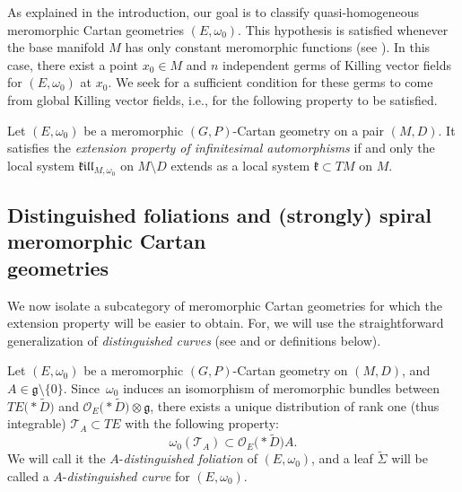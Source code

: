 \documentclass[10pt,a4paper]{amsart}
\numberwithin{equation}{section}
\begin{document}
As explained in the introduction, our goal is to classify quasi-homogeneous meromorphic Cartan geometries $(E,\omega_0)$. This hypothesis is satisfied whenever the base manifold $M$ has only constant meromorphic functions (see \cite[Theorem 1.2]{Dumitrescu1}). In this case, there exist a point $x_0 \in M$ and $n$ independent germs of Killing vector fields for $(E,\omega_0)$ at $x_0$. We seek for a sufficient condition for these germs to come from global Killing vector fields, i.e., for the following property to be satisfied.

\begin{Definition}\label{extensionproperty} Let $(E,\omega_0)$ be a meromorphic $(G,P)$-Cartan geometry on a pair $(M,D)$. It satisfies the \textit{extension property of infinitesimal automorphisms} if and only the local system $\mathfrak{k}\mathfrak{i}\mathfrak{l}\mathfrak{l}_{M,\omega_0}$ on $M\setminus D$ extends as a local system $\mathfrak{k}\subset TM$ on $M$. \end{Definition}

\subsection[Distinguished foliations and (strongly) spiral meromorphic Cartan geometries]{Distinguished foliations and (strongly) spiral meromorphic Cartan \\ geometries}\label{sectionspiral}

We now isolate a subcategory of meromorphic Cartan geometries for which the extension property will be easier to obtain. For, we will use the straightforward generalization of \textit{distinguished curves} (see \cite[p.~112]{Cap} and \cite[Definition~4.16]{Sharpe} or definitions below).

Let $(E,\omega_0)$ be a meromorphic $(G,P)$-Cartan geometry on $(M,D)$, and $A\in \mathfrak{g}\setminus \{0\}$. Since~$\omega_0$ induces an isomorphism of meromorphic bundles between $TE\bigl(* \tilde{D}\bigr)$ and $\mathcal{O}_E\bigl(* \tilde{D}\bigr) \otimes \mathfrak{g}$, there exists a unique distribution of rank one (thus integrable) $\mathcal{T}_A \subset TE$ with the following property:
 \begin{equation}\label{definitionTA} \omega_0(\mathcal{T}_A) \subset \mathcal{O}_E\bigl(* \tilde{D}\bigr) A. \end{equation}
 We will call it the $A$-\textit{distinguished foliation} of $(E,\omega_0)$, and a leaf $\tilde{\Sigma}$ will be called a $A$-\textit{distinguished curve} for $(E,\omega_0)$.
\end{document}
